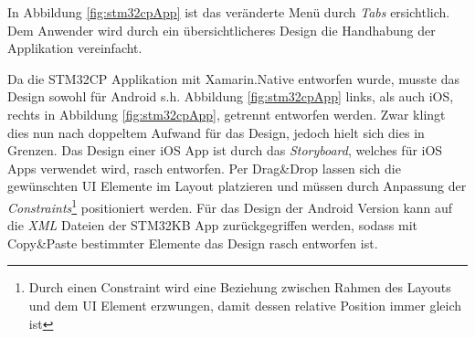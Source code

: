 	In Abbildung \ref{fig:stm32cpApp} ist das veränderte Menü durch \textit{Tabs} ersichtlich. Dem Anwender wird durch ein übersichtlicheres Design die Handhabung der Applikation vereinfacht.

	Da die STM32CP Applikation mit Xamarin.Native entworfen wurde, musste das Design sowohl für Android s.h. Abbildung \ref{fig:stm32cpApp} links, als auch iOS, rechts in Abbildung \ref{fig:stm32cpApp}, getrennt entworfen werden. Zwar klingt dies nun nach doppeltem Aufwand für das Design, jedoch hielt sich dies in Grenzen. Das Design einer iOS App ist durch das \textit{Storyboard}, welches für iOS Apps verwendet wird, rasch entworfen. Per Drag\&Drop lassen sich die gewünschten UI Elemente im Layout platzieren und müssen durch Anpassung der \textit{Constraints}\footnote{Durch einen Constraint wird eine Beziehung zwischen Rahmen des Layouts und dem UI Element erzwungen, damit dessen relative Position immer gleich ist} positioniert werden. Für das Design der Android Version kann auf die \textit{XML} Dateien der STM32KB App zurückgegriffen werden, sodass mit Copy\&Paste bestimmter Elemente das Design rasch entworfen ist.

